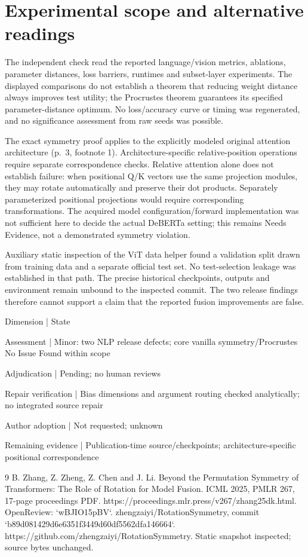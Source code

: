 \documentclass[10pt]{article}
\begin{document}
\section*{Experimental scope and alternative readings}
The independent check read the reported language/vision metrics, ablations, parameter distances, loss barriers, runtimes and subset-layer experiments. The displayed comparisons do not establish a theorem that reducing weight distance always improves test utility; the Procrustes theorem guarantees its specified parameter-distance optimum. No loss/accuracy curve or timing was regenerated, and no significance assessment from raw seeds was possible.\par
The exact symmetry proof applies to the explicitly modeled original attention architecture (p. 3, footnote 1). Architecture-specific relative-position operations require separate correspondence checks. Relative attention alone does not establish failure: when positional Q/K vectors use the same projection modules, they may rotate automatically and preserve their dot products. Separately parameterized positional projections would require corresponding transformations. The acquired model configuration/forward implementation was not sufficient here to decide the actual DeBERTa setting; this remains Needs Evidence, not a demonstrated symmetry violation.\par
Auxiliary static inspection of the ViT data helper found a validation split drawn from training data and a separate official test set. No test-selection leakage was established in that path. The precise historical checkpoints, outputs and environment remain unbound to the inspected commit. The two release findings therefore cannot support a claim that the reported fusion improvements are false.\par
Dimension | State\par
Assessment | Minor: two NLP release defects; core vanilla symmetry/Procrustes No Issue Found within scope\par
Adjudication | Pending; no human reviews\par
Repair verification | Bias dimensions and argument routing checked analytically; no integrated source repair\par
Author adoption | Not requested; unknown\par
Remaining evidence | Publication-time source/checkpoints; architecture-specific positional correspondence\par
9 B. Zhang, Z. Zheng, Z. Chen and J. Li. Beyond the Permutation Symmetry of Transformers: The Role of Rotation for Model Fusion. ICML 2025, PMLR 267, 17-page proceedings PDF. https://proceedings.mlr.press/v267/zhang25dk.html. OpenReview: `wBJIO15pBV`. zhengzaiyi/RotationSymmetry, commit `b89d081429d6e6351f3449d60df5562dfa146664`. https://github.com/zhengzaiyi/RotationSymmetry. Static snapshot inspected; source bytes unchanged.\par
\end{document}
